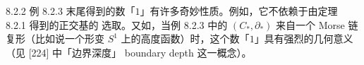 \begin{wrem}{8.2.2}
  例 8.2.3 末尾得到的数「$1$」有许多奇妙性质。例如，它不依赖于由定理 8.2.1 得到的正交基的
  选取。又如，当例 8.2.3 中的 $(C_*,\partial_*)$ 来自一个 Morse 链复形（比如说一个形变
  $S^1$ 上的高度函数）时，这个数「$1$」具有强烈的几何意义（见 [224] 中「边界深度」
  boundary depth 这一概念）。
\end{wrem}
